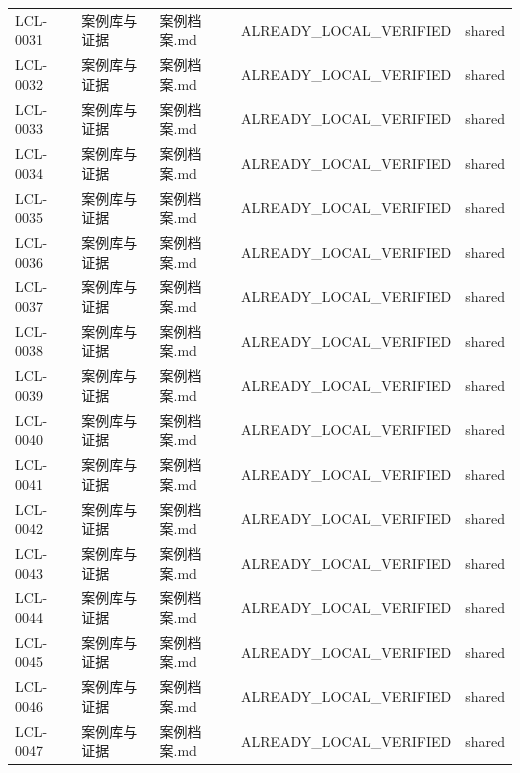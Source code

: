 \documentclass[UTF8,openany,oneside,11pt]{ctexbook}
\begin{document}
\begin{longtable}{L{1.4cm}L{2.4cm}L{6.0cm}L{3.0cm}L{1.8cm}}
LCL-\allowbreak{}0031 & 案例库与证据 & 案例档案.md & ALREADY\_\allowbreak{}LOCAL\_\allowbreak{}VERIFIED & shared \\
LCL-\allowbreak{}0032 & 案例库与证据 & 案例档案.md & ALREADY\_\allowbreak{}LOCAL\_\allowbreak{}VERIFIED & shared \\
LCL-\allowbreak{}0033 & 案例库与证据 & 案例档案.md & ALREADY\_\allowbreak{}LOCAL\_\allowbreak{}VERIFIED & shared \\
LCL-\allowbreak{}0034 & 案例库与证据 & 案例档案.md & ALREADY\_\allowbreak{}LOCAL\_\allowbreak{}VERIFIED & shared \\
LCL-\allowbreak{}0035 & 案例库与证据 & 案例档案.md & ALREADY\_\allowbreak{}LOCAL\_\allowbreak{}VERIFIED & shared \\
LCL-\allowbreak{}0036 & 案例库与证据 & 案例档案.md & ALREADY\_\allowbreak{}LOCAL\_\allowbreak{}VERIFIED & shared \\
LCL-\allowbreak{}0037 & 案例库与证据 & 案例档案.md & ALREADY\_\allowbreak{}LOCAL\_\allowbreak{}VERIFIED & shared \\
LCL-\allowbreak{}0038 & 案例库与证据 & 案例档案.md & ALREADY\_\allowbreak{}LOCAL\_\allowbreak{}VERIFIED & shared \\
LCL-\allowbreak{}0039 & 案例库与证据 & 案例档案.md & ALREADY\_\allowbreak{}LOCAL\_\allowbreak{}VERIFIED & shared \\
LCL-\allowbreak{}0040 & 案例库与证据 & 案例档案.md & ALREADY\_\allowbreak{}LOCAL\_\allowbreak{}VERIFIED & shared \\
LCL-\allowbreak{}0041 & 案例库与证据 & 案例档案.md & ALREADY\_\allowbreak{}LOCAL\_\allowbreak{}VERIFIED & shared \\
LCL-\allowbreak{}0042 & 案例库与证据 & 案例档案.md & ALREADY\_\allowbreak{}LOCAL\_\allowbreak{}VERIFIED & shared \\
LCL-\allowbreak{}0043 & 案例库与证据 & 案例档案.md & ALREADY\_\allowbreak{}LOCAL\_\allowbreak{}VERIFIED & shared \\
LCL-\allowbreak{}0044 & 案例库与证据 & 案例档案.md & ALREADY\_\allowbreak{}LOCAL\_\allowbreak{}VERIFIED & shared \\
LCL-\allowbreak{}0045 & 案例库与证据 & 案例档案.md & ALREADY\_\allowbreak{}LOCAL\_\allowbreak{}VERIFIED & shared \\
LCL-\allowbreak{}0046 & 案例库与证据 & 案例档案.md & ALREADY\_\allowbreak{}LOCAL\_\allowbreak{}VERIFIED & shared \\
LCL-\allowbreak{}0047 & 案例库与证据 & 案例档案.md & ALREADY\_\allowbreak{}LOCAL\_\allowbreak{}VERIFIED & shared \\

\end{longtable}
\end{document}
